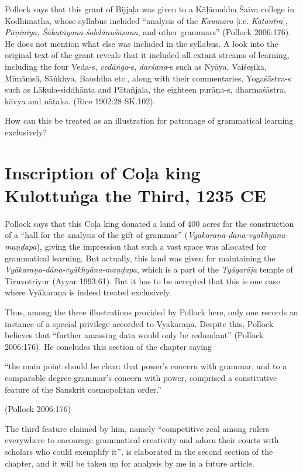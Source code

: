 Pollock says that this grant of Bijjaḷa was given to a Kāḷāmukha Śaiva college in Kodhimaṭha, whose syllabus included ``analysis of the {\sl Kaumāra} [i.e. {\sl Kātantra}], {\sl Pāṇinīya, Śākaṭāyana-śabdānuśāsana}, and other grammars'' (Pollock 2006:176). He does not mention what else was included in the syllabus. A look into the original text of the grant reveals that it included all extant streams of learning, including the four Veda-s, {\sl vedāṅga}-s, {\sl darśana}-s such as Nyāya, Vaiśeṣika, Mīmāṁsā, Sāṅkhya, Bauddha etc., along with their commentaries, \hbox{Yogaśāstra-s} such as Lākula-siddhānta and Pātañjala, the eighteen purāṇa-s, dharmaśāstra, kāvya and nāṭaka. (Rice 1902:28 SK.102).

How can this be treated as an illustration for patronage of grammatical learning exclusively?

\section{Inscription of Coḷa king Kulottuṅga the Third, 1235 CE}\label{chap3-sec18}

Pollock says that this Coḷa king donated a land of 400 acres for the construction of a ``hall for the analysis of the gift of grammar'' ({\sl Vyākaraṇa-dāna-vyākhyāna-maṇḍapa}), giving the impression that such a vast space was allocated for grammatical learning. But actually, this land was given for maintaining the {\sl Vyākaraṇa-dāna-vyākhyāna-maṇḍapa}, which is a part of the {\sl Tyāgarāja} temple of Tiruvotriyur (Ayyar 1993:61). But it has to be accepted that this is one case where Vyākaraṇa is indeed treated exclusively.

Thus, among the three illustrations provided by Pollock here, only one records an instance of a special privilege accorded to Vyākaraṇa. Despite this, Pollock believes that ``further amassing data would only be redundant'' (Pollock 2006:176). He concludes this section of the chapter saying
\begin{myquote}
``the main point should be clear: that power’s concern with grammar, and to a comparable degree grammar's concern with power, comprised a constitutive feature of the Sanskrit cosmopolitan order.''

\hfill (Pollock 2006:176)
\end{myquote}
The third feature claimed by him, namely ``competitive zeal among rulers everywhere to encourage grammatical creativity and adorn their courts with scholars who could exemplify it'', is elaborated in the second section of the chapter, and it will be taken up for analysis by me in a future article.

